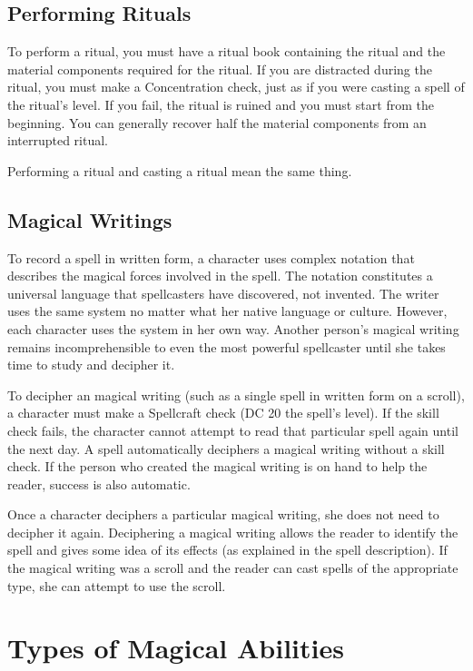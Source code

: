 \subsection{Performing Rituals}
\par To perform a ritual, you must have a ritual book containing the ritual and the material components required for the ritual. If you are distracted during the ritual, you must make a Concentration check, just as if you were casting a spell of the ritual's level. If you fail, the ritual is ruined and you must start from the beginning. You can generally recover half the material components from an interrupted ritual.
\par Performing a ritual and casting a ritual mean the same thing.
\subsection{Magical Writings}
To record a spell in written form, a character uses complex notation that describes the magical forces involved in the spell. The notation constitutes a universal language that spellcasters have discovered, not invented. The writer uses the same system no matter what her native language or culture. However, each character uses the system in her own way. Another person's magical writing remains incomprehensible to even the most powerful spellcaster until she takes time to study and decipher it.

To decipher an magical writing (such as a single spell in written form on a scroll), a character must make a Spellcraft check (DC 20 \add the spell's level). If the skill check fails, the character cannot attempt to read that particular spell again until the next day. A  spell automatically deciphers a magical writing without a skill check. If the person who created the magical writing is on hand to help the reader, success is also automatic.

Once a character deciphers a particular magical writing, she does not need to decipher it again. Deciphering a magical writing allows the reader to identify the spell and gives some idea of its effects (as explained in the spell description). If the magical writing was a scroll and the reader can cast spells of the appropriate type, she can attempt to use
the scroll.

\section{Types of Magical Abilities}

